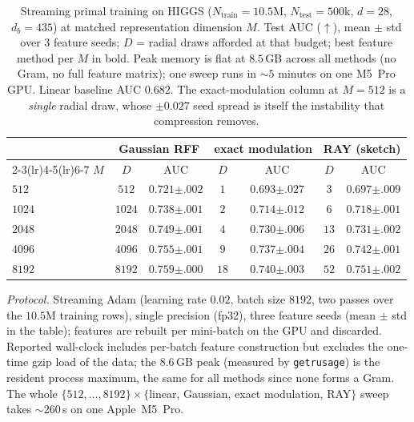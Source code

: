 \documentclass{article}
\begin{document}
\begin{table}[h]
\centering
\caption{Streaming primal training on HIGGS ($N_{\text{train}}=10.5$M, $N_{\text{test}}=500$k, $d=28$, $d_b=435$) at matched representation dimension $M$. Test AUC ($\uparrow$), mean $\pm$ std over $3$ feature seeds; $D$ = radial draws afforded at that budget; best feature method per $M$ in bold. Peak memory is flat at $8.5$\,GB across all methods (no Gram, no full feature matrix); one sweep runs in $\sim5$ minutes on one M5~Pro GPU. Linear baseline AUC $0.682$. The exact-modulation column at $M{=}512$ is a \emph{single} radial draw, whose $\pm0.027$ seed spread is itself the instability that compression removes.}
\label{tab:higgs}
\begin{tabular}{lcccccc}
\toprule
& \multicolumn{2}{c}{Gaussian RFF} & \multicolumn{2}{c}{exact modulation} & \multicolumn{2}{c}{RAY (sketch)} \\
\cmidrule(lr){2-3}\cmidrule(lr){4-5}\cmidrule(lr){6-7}
$M$ & $D$ & AUC & $D$ & AUC & $D$ & AUC \\
\midrule
$512$  & $512$  & $\mathbf{0.721}{\scriptstyle\pm.002}$ & $1$  & $0.693{\scriptstyle\pm.027}$ & $3$  & $0.697{\scriptstyle\pm.009}$ \\
$1024$ & $1024$ & $\mathbf{0.738}{\scriptstyle\pm.001}$ & $2$  & $0.714{\scriptstyle\pm.012}$ & $6$  & $0.718{\scriptstyle\pm.001}$ \\
$2048$ & $2048$ & $\mathbf{0.749}{\scriptstyle\pm.001}$ & $4$  & $0.730{\scriptstyle\pm.006}$ & $13$ & $0.731{\scriptstyle\pm.002}$ \\
$4096$ & $4096$ & $\mathbf{0.755}{\scriptstyle\pm.001}$ & $9$  & $0.737{\scriptstyle\pm.004}$ & $26$ & $0.742{\scriptstyle\pm.001}$ \\
$8192$ & $8192$ & $\mathbf{0.759}{\scriptstyle\pm.000}$ & $18$ & $0.740{\scriptstyle\pm.003}$ & $52$ & $0.751{\scriptstyle\pm.002}$ \\
\bottomrule
\end{tabular}
\end{table}

\noindent \emph{Protocol.} Streaming Adam (learning rate $0.02$, batch size $8192$, two passes over the $10.5$M training rows), single precision (fp32), three feature seeds (mean $\pm$ std in the table); features are rebuilt per mini-batch on the GPU and discarded. Reported wall-clock includes per-batch feature construction but excludes the one-time gzip load of the data; the $8.6$\,GB peak (measured by \texttt{getrusage}) is the resident process maximum, the same for all methods since none forms a Gram. The whole $\{512,\dots,8192\}\times\{$linear, Gaussian, exact modulation, RAY$\}$ sweep takes $\sim\!260$\,s on one Apple~M5~Pro.
\end{document}
